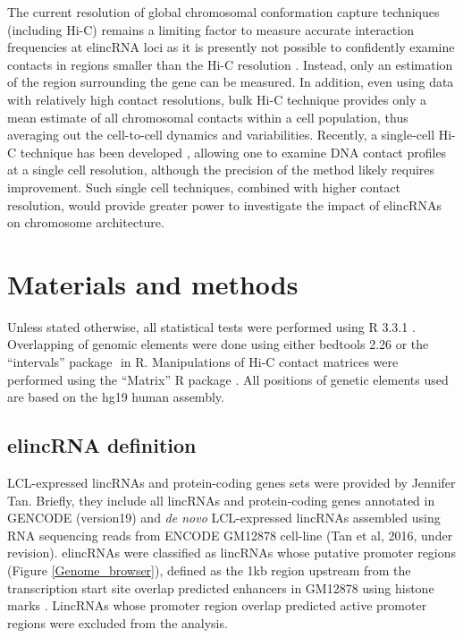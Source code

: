 \documentclass[11pt,a4paper]{report}
\begin{document}
The current resolution of global chromosomal conformation capture techniques (including Hi-C) remains a limiting factor to measure accurate interaction frequencies at elincRNA loci as it is presently not possible to confidently examine contacts in regions smaller than the Hi-C resolution \cite{Rao2014}⁠. Instead, only an estimation of the region surrounding the gene can be measured. In addition, even using data with relatively high contact resolutions, bulk Hi-C technique provides only a mean estimate of all chromosomal contacts within a cell population, thus averaging out the cell-to-cell dynamics and variabilities. Recently, a single-cell Hi-C technique has been developed \cite{Nagano2013}⁠, allowing one to examine DNA contact profiles at a single cell resolution, although the precision of the method likely requires improvement. Such single cell techniques, combined with higher contact resolution, would provide greater power to investigate the impact of elincRNAs on chromosome architecture.

\section*{Materials and methods}
Unless stated otherwise, all statistical tests were performed using R 3.3.1 \cite{RCoreTeam2016}⁠. Overlapping of genomic elements were done using either bedtools 2.26 \cite{Quinlan2010} ⁠or the “intervals” package \cite{Bourgon2015}⁠ in R. Manipulations of Hi-C contact matrices were performed using the “Matrix” R package \cite{Bates2016}⁠. All positions of genetic elements used are based on the hg19 human assembly.

\subsection*{elincRNA definition}

LCL-expressed lincRNAs and protein-coding genes sets were provided by Jennifer Tan. Briefly, they include all lincRNAs and protein-coding genes annotated in GENCODE (version19) and \textit{de novo} LCL-expressed lincRNAs assembled using RNA sequencing reads from ENCODE GM12878 cell-line (Tan et al, 2016, under revision). elincRNAs were classified as lincRNAs whose putative promoter regions (Figure \ref{Genome_browser}), defined as the 1kb region upstream from the transcription start site overlap predicted enhancers in GM12878 using histone marks \cite{ENCODEProject2012}⁠. LincRNAs whose promoter region overlap predicted active promoter regions were excluded from the analysis.
\end{document}
